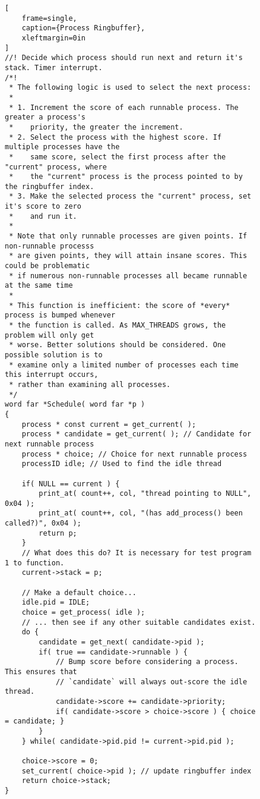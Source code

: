 \documentclass{article}
\begin{document}
\begin{figure}[tbhp] %
\label{fig:xrndbuff.h}
\begin{lstlisting}[
    frame=single,
    caption={Process Ringbuffer},
    xleftmargin=0in
]
//! Decide which process should run next and return it's stack. Timer interrupt.
/*!
 * The following logic is used to select the next process:
 *
 * 1. Increment the score of each runnable process. The greater a process's
 *    priority, the greater the increment.
 * 2. Select the process with the highest score. If multiple processes have the
 *    same score, select the first process after the "current" process, where
 *    the "current" process is the process pointed to by the ringbuffer index.
 * 3. Make the selected process the "current" process, set it's score to zero
 *    and run it.
 *
 * Note that only runnable processes are given points. If non-runnable processs
 * are given points, they will attain insane scores. This could be problematic
 * if numerous non-runnable processes all became runnable at the same time
 *
 * This function is inefficient: the score of *every* process is bumped whenever
 * the function is called. As MAX_THREADS grows, the problem will only get
 * worse. Better solutions should be considered. One possible solution is to
 * examine only a limited number of processes each time this interrupt occurs,
 * rather than examining all processes.
 */
word far *Schedule( word far *p )
{
    process * const current = get_current( );
    process * candidate = get_current( ); // Candidate for next runnable process
    process * choice; // Choice for next runnable process
    processID idle; // Used to find the idle thread

    if( NULL == current ) {
        print_at( count++, col, "thread pointing to NULL", 0x04 );
        print_at( count++, col, "(has add_process() been called?)", 0x04 );
        return p;
    }
    // What does this do? It is necessary for test program 1 to function.
    current->stack = p;

    // Make a default choice...
    idle.pid = IDLE;
    choice = get_process( idle );
    // ... then see if any other suitable candidates exist.
    do {
        candidate = get_next( candidate->pid );
        if( true == candidate->runnable ) {
            // Bump score before considering a process. This ensures that
            // `candidate` will always out-score the idle thread.
            candidate->score += candidate->priority;
            if( candidate->score > choice->score ) { choice = candidate; }
        }
    } while( candidate->pid.pid != current->pid.pid );

    choice->score = 0;
    set_current( choice->pid ); // update ringbuffer index
    return choice->stack;
}
\end{lstlisting}
\end{figure}
\end{document}
